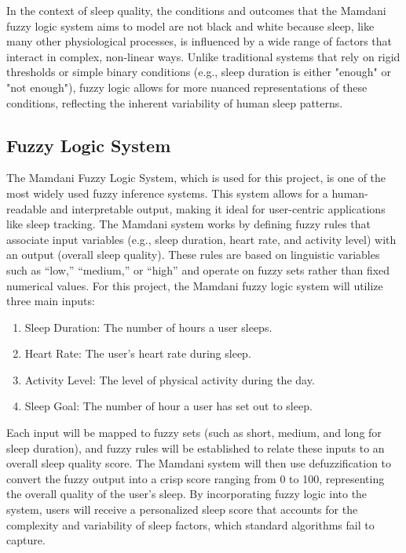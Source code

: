 \documentclass[10pt,twocolumn]{article}
\begin{document}
In the context of sleep quality, the conditions and outcomes that the Mamdani fuzzy logic system aims to model are not black and white because sleep, like many other physiological processes, is influenced by a wide range of factors that interact in complex, non-linear ways. Unlike traditional systems that rely on rigid thresholds or simple binary conditions (e.g., sleep duration is either "enough" or "not enough"), fuzzy logic allows for more nuanced representations of these conditions, reflecting the inherent variability of human sleep patterns.

\subsection{Fuzzy Logic System}

The Mamdani Fuzzy Logic System, which is used for this project, is one of the most widely used fuzzy inference systems. This system allows for a human-readable and interpretable output, making it ideal for user-centric applications like sleep tracking. The Mamdani system works by defining fuzzy rules that associate input variables (e.g., sleep duration, heart rate, and activity level) with an output (overall sleep quality). These rules are based on linguistic variables such as “low,” “medium,” or “high” and operate on fuzzy sets rather than fixed numerical values.
For this project, the Mamdani fuzzy logic system will utilize three main inputs:

\begin{enumerate}
\item Sleep Duration: The number of hours a user sleeps.
\item Heart Rate: The user's heart rate during sleep.
\item Activity Level: The level of physical activity during the day.
\item Sleep Goal: The number of hour a user has set out to sleep.
\end{enumerate}

Each input will be mapped to fuzzy sets (such as short, medium, and long for sleep duration), and fuzzy rules will be established to relate these inputs to an overall sleep quality score. The Mamdani system will then use defuzzification\cite{fuzzy-logic} to convert the fuzzy output into a crisp score ranging from 0 to 100, representing the overall quality of the user’s sleep.
By incorporating fuzzy logic into the system, users will receive a personalized sleep score that accounts for the complexity and variability of sleep factors, which standard algorithms fail to capture.
\end{document}
